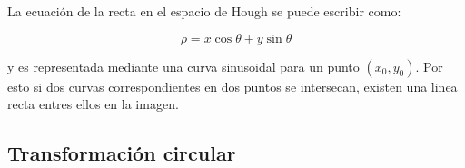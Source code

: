 La ecuación de la recta en el espacio de Hough se puede escribir como:

\begin{equation}
\rho = x\cos\theta + y\sin\theta
\end{equation}

y es representada mediante una curva sinusoidal para un punto $(x_{0},y_{0})$. Por esto si dos curvas correspondientes en dos puntos se intersecan, existen una linea recta entres ellos en la imagen.  

\subsection{Transformación circular}






